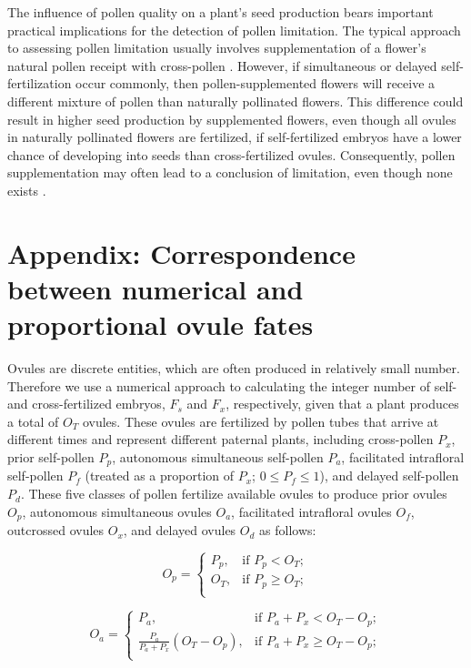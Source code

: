 \documentclass[letterpaper,titlepage]{scrartcl}
\begin{document}
The influence of pollen quality on a plant's seed production bears
important practical implications for the detection of pollen
limitation. The typical approach to assessing pollen limitation
usually involves supplementation of a flower's natural pollen receipt
with cross-pollen \citetext{reviewed by \citealp{Burd94}}. However, if
simultaneous or delayed self-fertilization occur commonly, then
pollen-supplemented flowers will receive a different mixture of pollen
than naturally pollinated flowers. This difference could result in
higher seed production by supplemented flowers, even though all ovules
in naturally pollinated flowers are fertilized, if self-fertilized
embryos have a lower chance of developing into seeds than
cross-fertilized ovules. Consequently, pollen supplementation may
often lead to a conclusion of limitation, even though none exists
\citetext{also see \citealp{Ramsey95,Ramsey00}}.

\section{Appendix: Correspondence between numerical and proportional ovule fates}
Ovules are discrete entities, which are often produced in relatively
small number. Therefore we use a numerical approach to calculating the
integer number of self- and cross-fertilized embryos, $F_{s}$ and
$F_{x}$, respectively, given that a plant produces a total of $O_{T}$
ovules. These ovules are fertilized by pollen tubes that arrive at
different times and represent different paternal plants, including
cross-pollen $P_{x}$, prior self-pollen $P_{p}$, autonomous
simultaneous self-pollen $P_{a}$, facilitated intrafloral self-pollen
$P_{f}$ (treated as a proportion of $P_{x}$; $0\leqslant
P_{f}\leqslant 1$), and delayed self-pollen $P_{d}$. These five
classes of pollen fertilize available ovules to produce prior ovules
$O_{p}$, autonomous simultaneous ovules $O_{a}$, facilitated
intrafloral ovules $O_{f}$, outcrossed ovules $O_{x}$, and delayed
ovules $O_{d}$ as follows:

\begin{equation}
  O_{p}=
  \begin{cases}
    P_{p},      &\text{if }P_{p} < O_{T};\\
    O_{T},      &\text{if }P_{p} \geqslant O_{T};\\
  \end{cases}
\end{equation}

\begin{equation}
  O_{a}=
  \begin{cases}
    P_{a}, & \text{if }P_{a} + P_{x} < O_{T} - O_{p};\\
    \frac{P_{a}}{P_{a} + P_{x}} \left( O_{T} - O_{p}\right), &\text{if }P_{a} + P_{x} \geqslant O_{T} - O_{p};\\
  \end{cases}
\end{equation}
\end{document}
